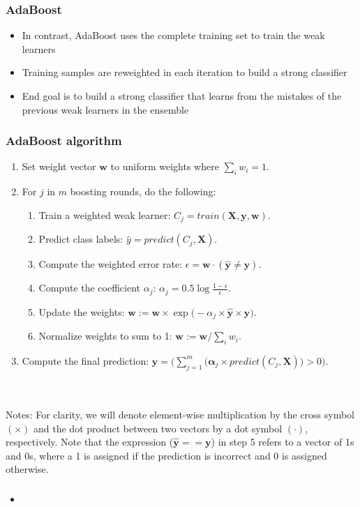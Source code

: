 \documentclass{beamer}
\begin{document}
\begin{frame}
  \frametitle{AdaBoost}
  \begin{itemize}
  \item In contrast, AdaBoost uses the complete training set to train the weak learners
  \item Training samples are reweighted in each iteration to build a strong classifier
  \item End goal is to build a strong classifier that learns from the mistakes of the previous weak learners in the ensemble
  \end{itemize}
\end{frame}

\begin{frame}
  \frametitle{AdaBoost algorithm}
  \begin{enumerate}
  \item Set weight vector $\mathbf{w}$ to uniform weights where $\sum_i  w_i = 1$.
  \item For $j$ in $m$ boosting rounds, do the following:
  \begin{enumerate}
  \item Train a weighted weak learner: $C_j = train(\mathbf{X, y, w})$.
  \item Predict class labels: $\hat{y} = predict(C_j, \mathbf{X})$.
  \item Compute the weighted error rate: $\epsilon = \mathbf{w} \cdot (\mathbf{\hat{y}} \neq \mathbf{y})$.
  \item Compute the coefficient $\alpha_j$: $\alpha_j=0.5 \log \frac{1 - \epsilon}{\epsilon}$.
  \item Update the weights: $\mathbf{w} := \mathbf{w} \times \exp \big( -\alpha_j \times \mathbf{\hat{y}} \times \mathbf{y} \big)$.
  \item Normalize weights to sum to 1: $\mathbf{w}:= \mathbf{w} / \sum_i w_i$.
  \end{enumerate}
  \item Compute the final prediction: $\mathbf{\hat{y}} = \big( \sum^{m}_{j=1} \big( \mathbf{\alpha}_j \times predict(C_j, \mathbf{X})  \big) > 0 \big)$.
  \end{enumerate}
  \scriptsize
  \\~\\
  Notes: For clarity, we will denote element-wise multiplication by the cross symbol $(\times)$ and the dot product between two vectors by a dot symbol $(\cdot)$, respectively. Note that the expression ($\mathbf{\hat{y}} == \mathbf{y}$) in step 5 refers to a vector of 1s and 0s, where a 1 is assigned if the prediction is incorrect and 0 is assigned otherwise.
\end{frame}

\begin{frame}
  \frametitle{}
  \begin{itemize}
  \item
  \end{itemize}
\end{frame}
\end{document}
